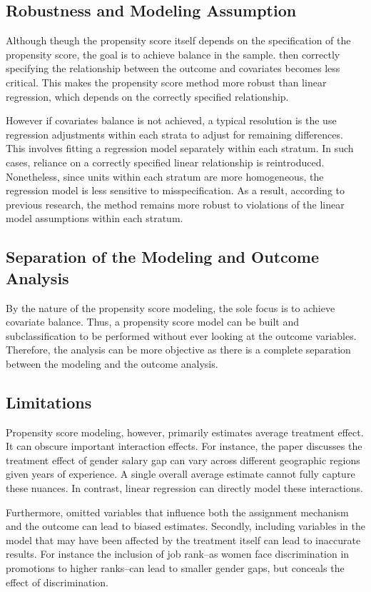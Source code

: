 \documentclass[12pt]{article}
\begin{document}
\subsection{Robustness and Modeling Assumption}

Although theugh the propensity score itself depends on the specification of the propensity score, the goal is to achieve balance in the sample. then correctly specifying the relationship between the outcome and covariates becomes less critical. This makes the propensity score method more robust than linear regression, which depends on the correctly specified relationship.

However if covariates balance is not achieved, a typical resolution is the use regression adjustments within each strata to adjust for remaining differences. This involves fitting a regression model separately within each stratum. In such cases, reliance on a correctly specified linear relationship is reintroduced. Nonetheless, since units within each stratum are more homogeneous, the regression model is less sensitive to misspecification. As a result, according to previous research, the method remains more robust to violations of the linear model assumptions within each stratum.



\subsection{Separation of the Modeling and Outcome Analysis}

By the nature of the propensity score modeling, the sole focus is to achieve covariate balance. Thus, a propensity score model can be built and subclassification to be performed without ever looking at the outcome variables. Therefore, the analysis can be more objective as there is a complete separation between the modeling and the outcome analysis.

\subsection{Limitations}

Propensity score modeling, however, primarily estimates average treatment effect. It can obscure important interaction effects. For instance, the paper discusses the treatment effect of gender salary gap can vary across different geographic regions given years of experience. A single overall average estimate cannot fully capture these nuances. In contrast, linear regression can directly model these interactions.

Furthermore, omitted variables that influence both the assignment mechanism and the outcome can lead to biased estimates. Secondly, including variables in the model that may have been affected by the treatment itself can lead to inaccurate results. For instance the inclusion of job rank--as women face discrimination in promotions to higher ranks--can lead to smaller gender gaps, but conceals the effect of discrimination.
\end{document}
